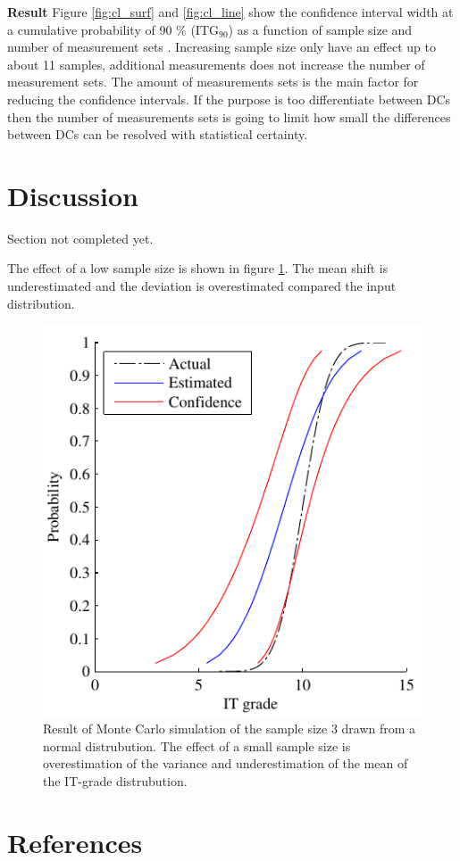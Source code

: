 \documentclass[aip,amsmath, reprint, author-year]{revtex4-1}
\begin{document}
\textbf{Result} Figure \ref{fig:cl_surf} and \ref{fig:cl_line} show the confidence interval width at a cumulative probability of 90 \% ($\mathrm{ITG_{90}}$) as a function of sample size and number of measurement sets . Increasing sample size only have an effect up to about 11 samples, additional measurements does not increase the number of measurement sets. The amount of measurements sets is the main factor for reducing the confidence intervals. If the purpose is too differentiate between DCs then the number of measurements sets is going to limit how small the differences between DCs can be resolved with statistical certainty.


\section{Discussion}

Section not completed yet. 

The effect of a low sample size is shown in figure \ref{fig:effect}. The mean shift is underestimated and the deviation is overestimated compared the input distribution.


\begin{figure}
\includegraphics{effectoflowsamplesize.pdf}
\caption{\label{fig:effect} Result of Monte Carlo simulation of the sample size 3 drawn from a normal distrubution. The effect of a small sample size is overestimation of the variance and underestimation of the mean of the IT-grade distrubution. }
\end{figure}

\section*{References}

\end{document}
